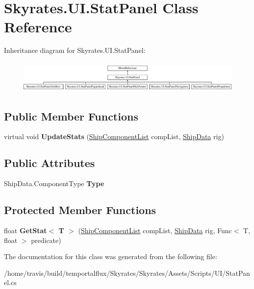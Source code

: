\hypertarget{class_skyrates_1_1_u_i_1_1_stat_panel}{\section{Skyrates.\-U\-I.\-Stat\-Panel Class Reference}
\label{class_skyrates_1_1_u_i_1_1_stat_panel}
}
Inheritance diagram for Skyrates.\-U\-I.\-Stat\-Panel\-:\begin{figure}[H]
\begin{center}
\leavevmode
\includegraphics[height=1.631068cm]{class_skyrates_1_1_u_i_1_1_stat_panel}
\end{center}
\end{figure}
\subsection*{Public Member Functions}
\begin{DoxyCompactItemize}
\item 
\hypertarget{class_skyrates_1_1_u_i_1_1_stat_panel_a57990cef17c16ec1d318d7673e8f7429}{virtual void {\bfseries Update\-Stats} (\hyperlink{class_skyrates_1_1_ship_1_1_ship_component_list}{Ship\-Component\-List} comp\-List, \hyperlink{class_skyrates_1_1_ship_1_1_ship_data}{Ship\-Data} rig)}\label{class_skyrates_1_1_u_i_1_1_stat_panel_a57990cef17c16ec1d318d7673e8f7429}

\end{DoxyCompactItemize}
\subsection*{Public Attributes}
\begin{DoxyCompactItemize}
\item 
\hypertarget{class_skyrates_1_1_u_i_1_1_stat_panel_a85d656ba86aeda2c8631db4f08f5007c}{Ship\-Data.\-Component\-Type {\bfseries Type}}\label{class_skyrates_1_1_u_i_1_1_stat_panel_a85d656ba86aeda2c8631db4f08f5007c}

\end{DoxyCompactItemize}
\subsection*{Protected Member Functions}
\begin{DoxyCompactItemize}
\item 
\hypertarget{class_skyrates_1_1_u_i_1_1_stat_panel_a6d75c97700cebc92edded4ca164c8173}{float {\bfseries Get\-Stat$<$ T $>$} (\hyperlink{class_skyrates_1_1_ship_1_1_ship_component_list}{Ship\-Component\-List} comp\-List, \hyperlink{class_skyrates_1_1_ship_1_1_ship_data}{Ship\-Data} rig, Func$<$ T, float $>$ predicate)}\label{class_skyrates_1_1_u_i_1_1_stat_panel_a6d75c97700cebc92edded4ca164c8173}

\end{DoxyCompactItemize}


The documentation for this class was generated from the following file\-:\begin{DoxyCompactItemize}
\item 
/home/travis/build/temportalflux/\-Skyrates/\-Skyrates/\-Assets/\-Scripts/\-U\-I/Stat\-Panel.\-cs\end{DoxyCompactItemize}
